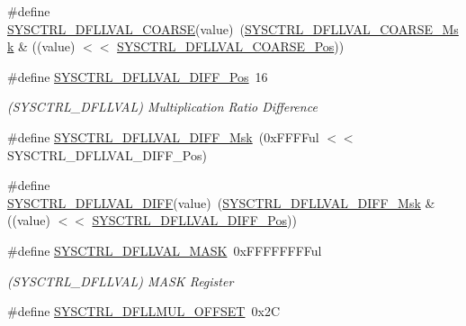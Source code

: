 \begin{DoxyCompactItemize}
\#define \mbox{\hyperlink{group___s_a_m_d21___s_y_s_c_t_r_l_ga388b8b51fb819f4f8422b3839820b273}{S\+Y\+S\+C\+T\+R\+L\+\_\+\+D\+F\+L\+L\+V\+A\+L\+\_\+\+C\+O\+A\+R\+SE}}(value)~(\mbox{\hyperlink{group___s_a_m_d21___s_y_s_c_t_r_l_ga5c0269f9089506917050d102ab624a43}{S\+Y\+S\+C\+T\+R\+L\+\_\+\+D\+F\+L\+L\+V\+A\+L\+\_\+\+C\+O\+A\+R\+S\+E\+\_\+\+Msk}} \& ((value) $<$$<$ \mbox{\hyperlink{group___s_a_m_d21___s_y_s_c_t_r_l_ga9c773fb2e30dff5065c2507544d00352}{S\+Y\+S\+C\+T\+R\+L\+\_\+\+D\+F\+L\+L\+V\+A\+L\+\_\+\+C\+O\+A\+R\+S\+E\+\_\+\+Pos}}))
\item 
\#define \mbox{\hyperlink{group___s_a_m_d21___s_y_s_c_t_r_l_ga8fe772ac87988d07d1000a26507c147b}{S\+Y\+S\+C\+T\+R\+L\+\_\+\+D\+F\+L\+L\+V\+A\+L\+\_\+\+D\+I\+F\+F\+\_\+\+Pos}}~16
\begin{DoxyCompactList}\small\item\em (S\+Y\+S\+C\+T\+R\+L\+\_\+\+D\+F\+L\+L\+V\+AL) Multiplication Ratio Difference \end{DoxyCompactList}\item 
\#define \mbox{\hyperlink{group___s_a_m_d21___s_y_s_c_t_r_l_ga02c7cefa8690a8b4315bb03130f9d4ab}{S\+Y\+S\+C\+T\+R\+L\+\_\+\+D\+F\+L\+L\+V\+A\+L\+\_\+\+D\+I\+F\+F\+\_\+\+Msk}}~(0x\+F\+F\+F\+Ful $<$$<$ S\+Y\+S\+C\+T\+R\+L\+\_\+\+D\+F\+L\+L\+V\+A\+L\+\_\+\+D\+I\+F\+F\+\_\+\+Pos)
\item 
\#define \mbox{\hyperlink{group___s_a_m_d21___s_y_s_c_t_r_l_gac65bd926cbd3b679eda5807f1ee8badd}{S\+Y\+S\+C\+T\+R\+L\+\_\+\+D\+F\+L\+L\+V\+A\+L\+\_\+\+D\+I\+FF}}(value)~(\mbox{\hyperlink{group___s_a_m_d21___s_y_s_c_t_r_l_ga02c7cefa8690a8b4315bb03130f9d4ab}{S\+Y\+S\+C\+T\+R\+L\+\_\+\+D\+F\+L\+L\+V\+A\+L\+\_\+\+D\+I\+F\+F\+\_\+\+Msk}} \& ((value) $<$$<$ \mbox{\hyperlink{group___s_a_m_d21___s_y_s_c_t_r_l_ga8fe772ac87988d07d1000a26507c147b}{S\+Y\+S\+C\+T\+R\+L\+\_\+\+D\+F\+L\+L\+V\+A\+L\+\_\+\+D\+I\+F\+F\+\_\+\+Pos}}))
\item 
\#define \mbox{\hyperlink{group___s_a_m_d21___s_y_s_c_t_r_l_ga8d4d3c5964c390bbddc4b40c6a68f285}{S\+Y\+S\+C\+T\+R\+L\+\_\+\+D\+F\+L\+L\+V\+A\+L\+\_\+\+M\+A\+SK}}~0x\+F\+F\+F\+F\+F\+F\+F\+Ful
\begin{DoxyCompactList}\small\item\em (S\+Y\+S\+C\+T\+R\+L\+\_\+\+D\+F\+L\+L\+V\+AL) M\+A\+SK Register \end{DoxyCompactList}\item 
\#define \mbox{\hyperlink{group___s_a_m_d21___s_y_s_c_t_r_l_gace15bb8792855588ccd379d625a54fd9}{S\+Y\+S\+C\+T\+R\+L\+\_\+\+D\+F\+L\+L\+M\+U\+L\+\_\+\+O\+F\+F\+S\+ET}}~0x2C
$$
\end{DoxyCompactItemize}
